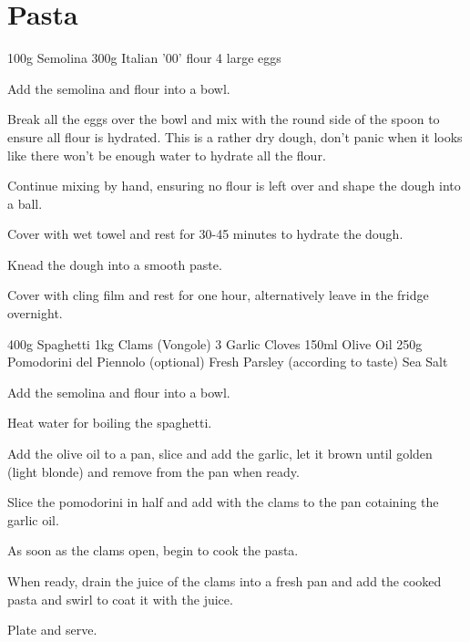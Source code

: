 \chapter{Pasta}
\minitoc

\label{rec:egg-pasta}

\begin{ingreds}
	100g Semolina
	300g Italian '00' flour
	4 large eggs
\end{ingreds}

\begin{method}		
     	Add the semolina and flour into a bowl.

	Break all the eggs over the bowl and mix with the round side of the spoon to ensure all flour is hydrated.  This is a rather dry dough, don't panic when it looks like there won't be enough water to hydrate all the flour.

	Continue mixing by hand, ensuring no flour is left over and shape the dough into a ball.

	Cover with wet towel and rest for 30-45 minutes to hydrate the dough.

	Knead the dough into a smooth paste.

	Cover with cling film and rest for one hour, alternatively leave in the fridge overnight.

\end {method}


\label{rec:pasta-spaghetti-vongole-napoli}

\begin{ingreds}
	400g Spaghetti
	1kg Clams (Vongole)
	3 Garlic Cloves
	150ml Olive Oil
	250g Pomodorini del Piennolo (optional)
	Fresh Parsley (according to taste)
	Sea Salt
\end{ingreds}

\begin{method}		
     	Add the semolina and flour into a bowl.

	Heat water for boiling the spaghetti.

	Add the olive oil to a pan, slice and add the garlic, let it brown until golden (light blonde) and remove from the pan when ready.

	Slice the pomodorini in half and add with the clams to the pan cotaining the garlic oil.

	As soon as the clams open, begin to cook the pasta.

	When ready, drain the juice of the clams into a fresh pan and add the cooked pasta and swirl to coat it with the juice.

	Plate and serve.

\end {method}




